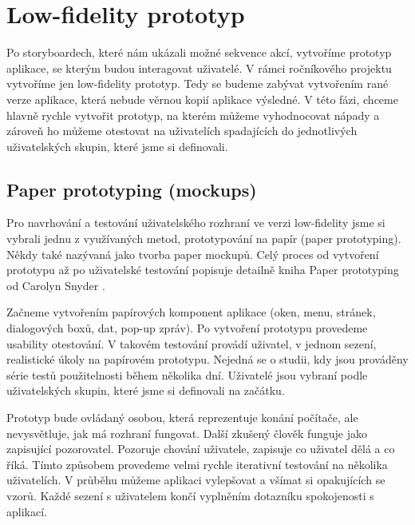 \chapter{Low-fidelity prototyp}



Po storyboardech, které nám ukázali možné sekvence akcí, vytvoříme prototyp aplikace, se kterým budou interagovat uživatelé. V rámci ročníkového projektu vytvoříme jen low-fidelity prototyp. Tedy se budeme zabývat vytvořením rané verze aplikace, která nebude věrnou kopií aplikace výsledné. V této fázi, chceme hlavně rychle vytvořit prototyp, na kterém můžeme vyhodnocovat nápady a zároveň ho můžeme otestovat na uživatelích spadajících do jednotlivých uživatelských skupin, které jsme si definovali.

\section{Paper prototyping (mockups)}

Pro navrhování a testování uživatelského rozhraní ve verzi low-fidelity jsme si vybrali jednu z využívaných metod, prototypování na papír (paper prototyping). Někdy také nazývaná jako tvorba paper mockupů. Celý proces od vytvoření prototypu až po uživatelské testování popisuje detailně kniha Paper prototyping od Carolyn Snyder \cite{Paper_Prototyping}.

Začneme vytvořením papírových komponent aplikace (oken, menu, stránek, dialogových boxů, dat, pop-up zpráv). 
Po vytvoření prototypu provedeme usability otestování.
V takovém testování provádí uživatel, v jednom sezení, realistické úkoly na papírovém prototypu. Nejedná se o studii, kdy jsou prováděny série testů použitelnosti během několika dní. Uživatelé jsou vybraní podle uživatelských skupin, které jsme si definovali na začátku.

Prototyp bude ovládaný osobou, která reprezentuje konání počítače, ale nevysvětluje, jak má rozhraní fungovat. Další zkušený člověk funguje jako zapisující pozorovatel. Pozoruje chování uživatele, zapisuje co uživatel dělá a co říká. Tímto způsobem provedeme velmi rychle iterativní testování na několika uživatelích. V průběhu můžeme aplikaci vylepšovat a všímat si opakujících se vzorů. Každé sezení s uživatelem končí vyplněním dotazníku spokojenosti s aplikací.

